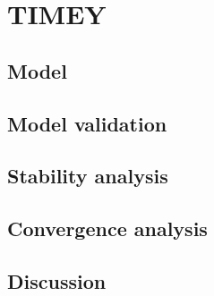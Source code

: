 \section{TIMEY}

\subsection{Model}

\subsection{Model validation}

\subsection{Stability analysis}

\subsection{Convergence analysis}

\subsection{Discussion}
